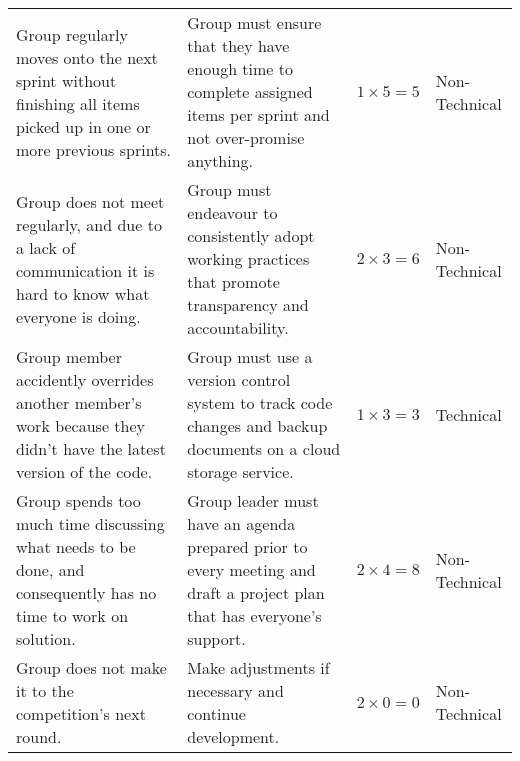 \begin{table}
\begin{tabular*}{14.0cm}{p{4.0cm}p{5.0cm}p{1.5cm}p{2cm}}
    \addlinespace[0.5em]
    Group regularly moves onto the next sprint without finishing all items picked up in one or more previous sprints. & Group must ensure that they have enough time to complete assigned items per sprint and not over-promise anything. & $1 \times 5 = 5$ & Non-Technical \\
    Group does not meet regularly, and due to a lack of communication it is hard to know what everyone is doing. & Group must endeavour to consistently adopt working practices that promote transparency and accountability. & $2 \times 3 = 6$ & Non-Technical \\
    \addlinespace[0.5em]
    Group member accidently overrides another member’s work because they didn’t have the latest version of the code. & Group must use a version control system to track code changes and backup documents on a cloud storage service. & $1 \times 3 = 3$ & Technical \\
    \addlinespace[0.5em]
    Group spends too much time discussing what needs to be done, and consequently has no time to work on solution. & Group leader must have an agenda prepared prior to every meeting and draft a project plan that has everyone’s support. & $2 \times 4 = 8$ & Non-Technical \\
    \addlinespace[0.5em]
    Group does not make it to the competition’s next round. & Make adjustments if necessary and continue development. & $2 \times 0 = 0$ & Non-Technical \\
    \bottomrule
  \end{tabular*}
\end{table}
